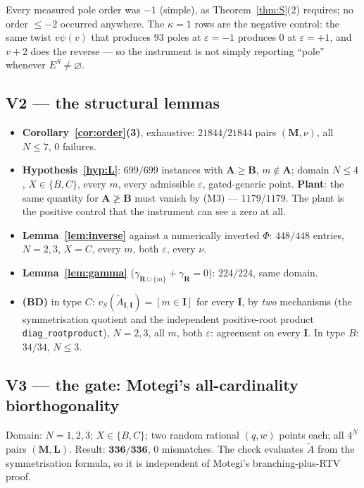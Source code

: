 \documentclass[11pt]{article}
\theoremstyle{definition}
\newcommand{\At}{\widetilde{A}}
\newcommand{\bM}{\mathbf{M}}
\newcommand{\bI}{\mathbf{I}}
\newcommand{\bA}{\mathbf{A}}
\newcommand{\bB}{\mathbf{B}}
\newcommand{\bR}{\mathbf{R}}
\newcommand{\ES}{E^{S}}
\begin{document}
\noindent
Every measured pole order was $-1$ (simple), as Theorem~\ref{thm:S}(2) requires;
no order $\le-2$ occurred anywhere.  The $\kappa=1$ rows are the negative
control: the same twist $v\psi(v)$ that produces $93$ poles at $\varepsilon=-1$
produces $0$ at $\varepsilon=+1$, and $v+2$ does the reverse --- so the
instrument is not simply reporting ``pole'' whenever $\ES\ne\varnothing$.

\subsection*{V2 --- the structural lemmas}
\begin{itemize}
\item \textbf{Corollary~\ref{cor:order}(3)}, exhaustive: $21844/21844$ pairs
  $(\bM,\nu)$, all $N\le7$, $0$ failures.
\item \textbf{Hypothesis~\ref{hyp:L}}: $699/699$ instances with $\bA\ge\bB$,
  $m\notin\bA$; domain $N\le4$, $X\in\{B,C\}$, every $m$, every admissible
  $\varepsilon$, gated-generic point.  \textbf{Plant}: the same quantity for
  $\bA\not\ge\bB$ must vanish by (M3) --- $1179/1179$.  The plant is the positive
  control that the instrument can see a zero at all.
\item \textbf{Lemma~\ref{lem:inverse}} against a numerically inverted $\Phi$:
  $448/448$ entries, $N=2,3$, $X=C$, every $m$, both $\varepsilon$, every $\nu$.
\item \textbf{Lemma~\ref{lem:gamma}} ($\gamma_{\bR\cup\{m\}}+\gamma_{\bR}=0$):
  $224/224$, same domain.
\item \textbf{(BD)} in type $C$: $v_S(\At_{\bI,\bI})=[m\in\bI]$ for every $\bI$,
  by \emph{two} mechanisms (the symmetrisation quotient and the independent
  positive-root product \texttt{diag\_rootproduct}), $N=2,3$, all $m$, both
  $\varepsilon$: agreement on every $\bI$.  In type $B$: $34/34$, $N\le3$.
\end{itemize}

\subsection*{V3 --- the gate: Motegi's all-cardinality biorthogonality}
Domain: $N=1,2,3$; $X\in\{B,C\}$; two random rational $(q,w)$ points each; all
$4^{N}$ pairs $(\bM,\mathbf L)$.  Result: $\mathbf{336/336}$, $0$ mismatches.
The check evaluates $\At$ from the symmetrisation formula, so it is independent
of Motegi's branching-plus-RTV proof.
\end{document}
